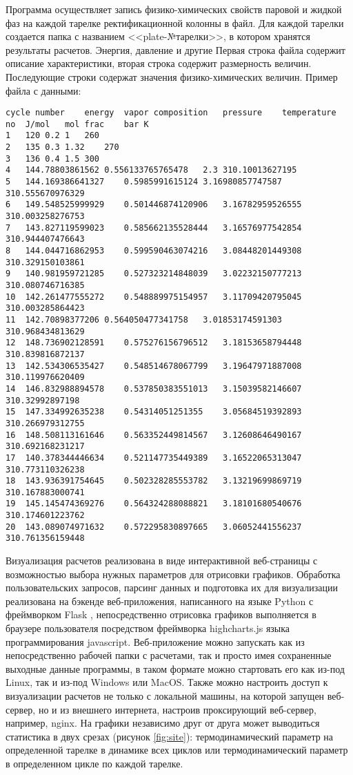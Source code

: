 Программа осуществляет запись физико-химических свойств паровой и жидкой фаз на каждой тарелке ректификационной колонны в файл. Для каждой тарелки создается папка с названием <<plate-№тарелки>>, в котором хранятся результаты расчетов. Энергия, давление и другие 
Первая строка файла содержит описание характеристики, вторая строка содержит размерность величин. Последующие строки содержат значения физико-химических величин. 
Пример файла с данными:
\lstset{language=Pascal}
\begin{lstlisting}
cycle number	energy	vapor composition	pressure	temperature
no	J/mol	mol frac	bar	K
1	120	0.2	1	260
2	135	0.3	1.32	270
3	136	0.4	1.5	300
4	144.78803861562	0.556133765765478	2.3	310.10013627195
5	144.169386641327	0.5985991615124	3.16980857747587	310.555670976329
6	149.548525999929	0.501446874120906	3.16782959526555	310.003258276753
7	143.827119599023	0.585662135528444	3.16576977542854	310.944407476643
8	144.044716862953	0.599590463074216	3.08448201449308	310.329150103861
9	140.981959721285	0.527323214848039	3.02232150777213	310.080746716385
10	142.261477555272	0.548889975154957	3.11709420795045	310.003285864423
11	142.70898377206	0.564050477341758	3.01853174591303	310.968434813629
12	148.736902128591	0.575276156796512	3.18153658794448	310.839816872137
13	142.534306535427	0.548514678067799	3.19647971887008	310.119976620409
14	146.832988894578	0.537850383551013	3.15039582146607	310.32992897198
15	147.334992635238	0.54314051251355	3.05684519392893	310.266979312755
16	148.508113161646	0.563352449814567	3.12608646490167	310.692168231217
17	140.378344446634	0.521147735449389	3.16522065313047	310.773110326238
18	143.936391754645	0.502328285553782	3.13219699869719	310.167883000741
19	145.145474369276	0.564324288088821	3.18101680540676	310.174601223762
20	143.089074971632	0.572295830897665	3.06052441556237	310.761356159448
\end{lstlisting}

Визуализация расчетов реализована в виде интерактивной веб-страницы с возможностью выбора нужных параметров для отрисовки графиков. Обработка пользовательских запросов, парсинг данных и подготовка их для визуализации реализована на бэкенде веб-приложения, написанного на языке Python с фреймворком Flask \cite{flask}, непосредственно отрисовка графиков выполняется в браузере пользователя посредством фреймворка highcharts.js \cite{highcharts} языка программирования javascript.
Веб-приложение можно запускать как из непосредственно рабочей папки с расчетами, так и просто имея сохраненные выходные данные программы, в таком формате можно стартовать его как из-под Linux, так и из-под Windows или MacOS. Также можно настроить доступ к визуализации расчетов не только с локальной машины, на которой запущен веб-сервер, но и из внешнего интернета, настроив проксирующий веб-сервер, например, nginx.
На графики независимо друг от друга может выводиться статистика в двух срезах (рисунок \ref{fig:site}): термодинамический параметр на определенной тарелке в динамике всех циклов или термодинамический параметр в определенном цикле по каждой тарелке.

